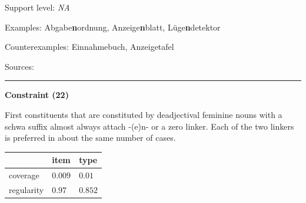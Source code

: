 \vspace{-1.35em}

\noindent
Support level: \textit{NA}

\vspace{0.3em}

\noindent
Examples: Abgabe\textbf{n}ordnung, Anzeige\textbf{n}blatt, Lüge\textbf{n}detektor

\noindent
Counterexamples: Einnahme{\zeroLinker}buch, Anzeige{\zeroLinker}tafel

\vspace{0.3em}

\noindent
Sources: \citet[93]{ortner_müller-bollhagen_1991}

\vspace{0.35em}
\hrule




\vspace{0.4em}

\begin{center}
\textbf{Constraint (22)}
\end{center}

\noindent
First constituents that are constituted by deadjectival feminine nouns with a schwa suffix almost always attach -(e)n- or a zero linker. Each of the two linkers is preferred in about the same number of cases.
\vspace{0.5em}


\vspace{-0.25em}

\begin{table}[!ht]
\begin{center}
\setlength{\extrarowheight}{1pt}
\begin{tabularx}{\columnwidth}{|X|X|X|}
\hline
 & item & type \\
\hline
 coverage & $0.009$ & $0.01$ \\
\hline
 regularity & $0.97$ & $0.852$ \\
\hline
\end{tabularx}
\end{center}
\end{table}

